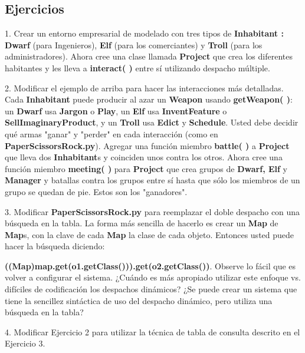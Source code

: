 \subsection*{Ejercicios}
\label{subsec:Ejercicios13}


1. Crear un entorno empresarial de modelado con tres tipos de \textbf{Inhabitant : Dwarf} (para Ingenieros), \textbf{Elf} (para los comerciantes) y \textbf{Troll} (para los administradores). Ahora cree una clase llamada \textbf{Project} que crea los diferentes habitantes y les lleva a \textbf{interact( )} entre sí utilizando despacho múltiple.   \newline

2. Modificar el ejemplo de arriba para hacer las interacciones más detalladas. Cada \textbf{Inhabitant} puede producir al azar un \textbf{Weapon} usando \textbf{getWeapon( )}: un \textbf{Dwarf} usa \textbf{Jargon} o \textbf{Play}, un \textbf{Elf} usa \textbf{InventFeature} o \textbf{SellImaginaryProduct}, y un \textbf{Troll} usa \textbf{Edict} y \textbf{Schedule}. Usted debe decidir qué armas "ganar" y "perder" en cada interacción (como en \textbf{PaperScissorsRock.py}). Agregar una función miembro \textbf{battle( )} a \textbf{Project} que lleva dos \textbf{Inhabitant}s y coinciden unos contra los otros. Ahora cree una función miembro \textbf{meeting( )} para \textbf{Project} que crea grupos de \textbf{Dwarf, Elf} y \textbf{Manager} y batallas contra los grupos entre sí hasta que sólo los miembros de un grupo se quedan de pie.  Estos son los "ganadores".    \newline

3. Modificar \textbf{PaperScissorsRock.py} para reemplazar el doble despacho con una búsqueda en la tabla. La forma más sencilla de hacerlo es crear un \textbf{Map} de \textbf{Map}s, con la clave de cada \textbf{Map} la clase de cada objeto. Entonces usted puede hacer la búsqueda diciendo: \par
\textbf{((Map)map.get(o1.getClass())).get(o2.getClass())}. \newline
Observe lo fácil que es volver a configurar el sistema. ¿Cuándo es más apropiado utilizar este enfoque vs. difíciles de codificación los despachos dinámicos? ¿Se puede crear un sistema que tiene la sencillez sintáctica de uso del despacho dinámico, pero utiliza una búsqueda en la tabla?   \newline

4. Modificar Ejercicio 2 para utilizar la técnica de tabla de consulta descrito en el Ejercicio 3.     \newline

\newpage
